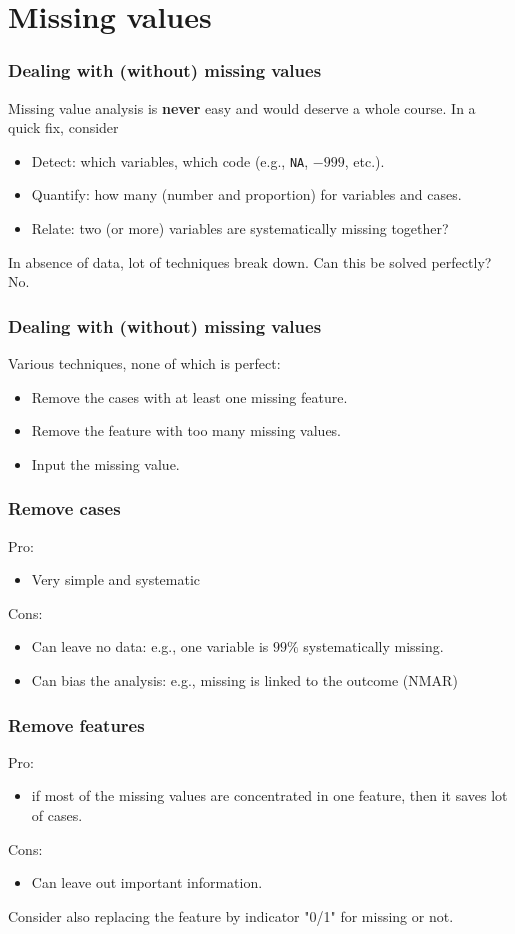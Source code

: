 \section{Missing values}
\begin{frame}
\frametitle{Dealing with (without) missing values}
Missing value analysis is {\bf never} easy and would deserve a whole course. In a quick fix, consider
\begin{itemize}
\item Detect: which variables, which code (e.g., {\tt NA}, $-999$, etc.).  
\item Quantify: how many (number and proportion) for variables and cases.
\item Relate: two (or more) variables are systematically missing together?
\end{itemize}
In absence of data, lot of techniques break down. Can this be solved perfectly? No.
\end{frame}
\begin{frame}
\frametitle{Dealing with (without) missing values}
Various techniques, none of which is perfect:
\begin{itemize}
\item Remove the cases with at least one missing feature.
\item Remove the feature with too many missing values.
\item Input the missing value.
\end{itemize}
\end{frame}
\begin{frame}
\frametitle{Remove cases}
Pro:
\begin{itemize}
\item Very simple and systematic
\end{itemize}
Cons:
\begin{itemize}
\item Can leave no data: e.g., one variable is $99\%$ systematically missing.
\item Can bias the analysis: e.g., missing is linked to the outcome (NMAR)
\end{itemize}
\end{frame}
\begin{frame}
\frametitle{Remove features}
Pro:
\begin{itemize}
\item if most of the missing values are concentrated in one feature, then it saves lot of cases.
\end{itemize}
Cons:
\begin{itemize}
\item Can leave out important information.
\end{itemize}
Consider also replacing the feature by indicator "0/1" for missing or not. 
\end{frame}
